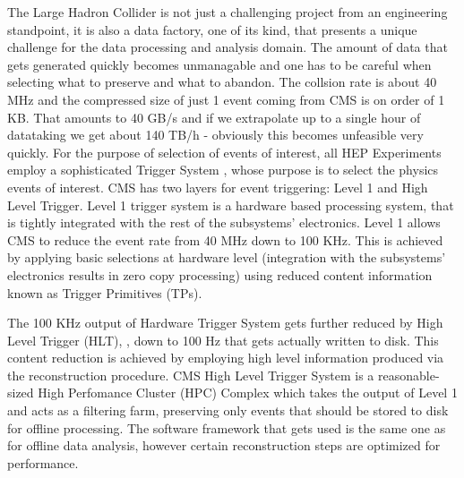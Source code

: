 The Large Hadron Collider is not just a challenging project from an engineering standpoint, it is also a data factory, one of its kind, that presents a unique challenge for the data processing and analysis domain. The amount of data that gets generated quickly becomes unmanagable and one has to be careful when selecting what to preserve and what to abandon. The collsion rate is about 40 MHz and the compressed size of just 1 event coming from CMS is on order of 1 KB. That amounts to 40 GB/s and if we extrapolate up to a single hour of datataking we get about 140 TB/h - obviously this becomes unfeasible very quickly. For the purpose of selection of events of interest, all HEP Experiments employ a sophisticated Trigger System \cite{L1Trigger}, whose purpose is to select the physics events of interest. CMS has two layers for event triggering: Level 1 and High Level Trigger. Level 1 trigger system is a hardware based processing system, that is tightly integrated with the rest of the subsystems' electronics. Level 1 allows CMS to reduce the event rate from 40 MHz down to 100 KHz. This is achieved by applying basic selections at hardware level (integration with the subsystems' electronics results in zero copy processing) using reduced content information known as Trigger Primitives (TPs).

The 100 KHz output of Hardware Trigger System gets further reduced by High Level Trigger (HLT), \cite{HLTrigger}, down to 100 Hz that gets actually written to disk. This content reduction is achieved by employing high level information produced via the reconstruction procedure. CMS High Level Trigger System is a reasonable-sized High Perfomance Cluster (HPC) Complex which takes the output of Level 1 and acts as a filtering farm, preserving only events that should be stored to disk for offline processing. The software framework that gets used is the same one as for offline data analysis, however certain reconstruction steps are optimized for performance.



